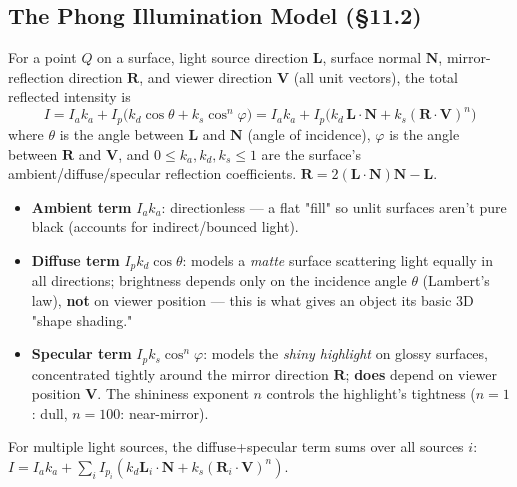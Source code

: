 \documentclass[12pt, a4paper]{article}
\newenvironment{answerbox}{\begin{mdframed}[style=answerframe]}{\end{mdframed}}
\begin{document}
\subsection{The Phong Illumination Model (\S11.2)}
\begin{answerbox}
For a point $Q$ on a surface, light source direction $\mathbf{L}$, surface normal $\mathbf{N}$, mirror-reflection direction $\mathbf{R}$, and viewer direction $\mathbf{V}$ (all unit vectors), the total reflected intensity is
$$I = I_a k_a + I_p\big(k_d\cos\theta + k_s\cos^{n}\varphi\big) = I_a k_a + I_p\big(k_d\,\mathbf{L}\!\cdot\!\mathbf{N} + k_s(\mathbf{R}\!\cdot\!\mathbf{V})^{n}\big)$$
where $\theta$ is the angle between $\mathbf{L}$ and $\mathbf{N}$ (angle of incidence), $\varphi$ is the angle between $\mathbf{R}$ and $\mathbf{V}$, and $0\le k_a,k_d,k_s\le1$ are the surface's ambient/diffuse/specular reflection coefficients. $\mathbf{R} = 2(\mathbf{L}\!\cdot\!\mathbf{N})\mathbf{N}-\mathbf{L}$.
\begin{itemize}[noitemsep]
  \item \textbf{Ambient term} $I_ak_a$: directionless — a flat "fill" so unlit surfaces aren't pure black (accounts for indirect/bounced light).
  \item \textbf{Diffuse term} $I_p k_d\cos\theta$: models a \emph{matte} surface scattering light equally in all directions; brightness depends only on the incidence angle $\theta$ (Lambert's law), \textbf{not} on viewer position — this is what gives an object its basic 3D "shape shading."
  \item \textbf{Specular term} $I_p k_s\cos^{n}\varphi$: models the \emph{shiny highlight} on glossy surfaces, concentrated tightly around the mirror direction $\mathbf{R}$; \textbf{does} depend on viewer position $\mathbf{V}$. The shininess exponent $n$ controls the highlight's tightness ($n=1$: dull, $n=100$: near-mirror).
\end{itemize}
For multiple light sources, the diffuse+specular term sums over all sources $i$: $I = I_ak_a + \sum_i I_{p_i}(k_d\mathbf{L}_i\!\cdot\!\mathbf{N} + k_s(\mathbf{R}_i\!\cdot\!\mathbf{V})^n)$.
\end{answerbox}
\end{document}
